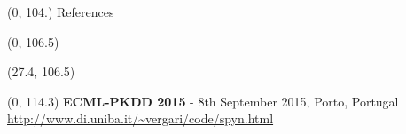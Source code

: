 \documentclass[final]{beamer}
\begin{document}
\begin{frame}{}
  
  
  
  \begin{textblock}{80}(0, 104.)
    References
  \end{textblock}
  

  \begin{textblock}{52}(0, 106.5)
    \small
    \setlength\bibitemsep{8pt}
    \printbibliography
  \end{textblock}
  
  \begin{textblock}{25.2}(27.4, 106.5)
    \small
  \end{textblock}
  

  \begin{textblock}{80}(0, 114.3)
    \footnotesize
    \textbf{ECML-PKDD 2015} - 8th September 2015, Porto, Portugal\hfill
    {\url{http://www.di.uniba.it/~vergari/code/spyn.html}}
  \end{textblock}
  
\end{frame}
\end{document}
